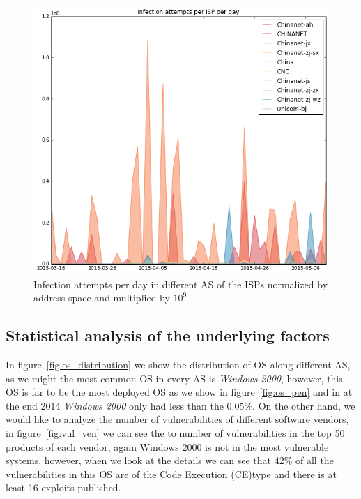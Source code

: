 \begin{figure}[h]
     \caption{Infection attempts per day in different AS of the ISPs normalized by address space and multiplied by $10^9$}
     \label{fig:isp_legend_area}
    \centering
    \includegraphics[width=\linewidth]{images/isp_legend_area_norm}
\end{figure}

\subsection{Statistical analysis of the underlying factors}
In figure~\ref{fig:os_distribution} we show the distribution of OS along different AS, as we might the most common OS in every AS is \textit{Windows 2000}, however, this OS is far to be the most deployed OS as we show in figure~\ref{fig:os_pen} and in \cite{os_pen} at the end 2014 \textit{Windows 2000} only had less than the 0.05\%.
On the other hand, we would like to analyze the number of vulnerabilities of different software vendors, in figure~\ref{fig:vul_ven} we can see the to number of vulnerabilities in the top 50 products of each vendor, again Windows 2000 is not in the most vulnerable systems, however, when we look at the details we can see that 42\% of all the vulnerabilities in this OS are of the Code Execution (CE)type and there is at least 16 exploits published.


